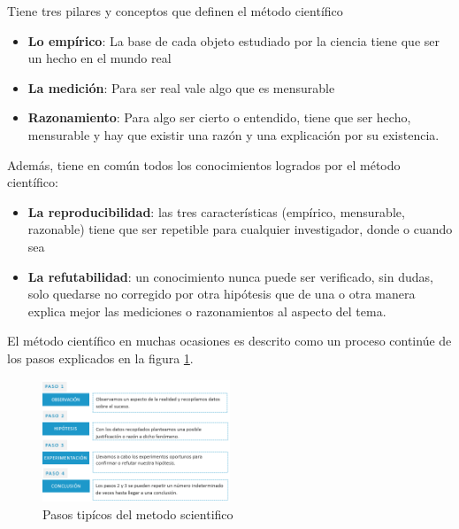 \documentclass[article]{elsarticle}
\begin{document}
\vspace{1.5\baselineskip}

Tiene tres pilares y conceptos que definen el método científico

\begin{itemize}
\item \textbf{Lo empírico}: La base de cada objeto estudiado por la ciencia
    tiene que ser un hecho en el mundo real
\item \textbf{La medición}: Para ser real vale algo que es mensurable
\item \textbf{Razonamiento}: Para algo ser cierto o entendido, tiene que ser
    hecho, mensurable y hay que existir una razón y una explicación por su existencia.
\end{itemize}

\vspace{1.5\baselineskip}

Además, tiene en común todos los conocimientos logrados por el método científico:
\begin{itemize}
\item \textbf{La reproducibilidad}: las tres características (empírico,
    mensurable, razonable) tiene que ser repetible para cualquier investigador,
    donde o cuando sea
\item \textbf{La refutabilidad}: un conocimiento nunca puede ser verificado,
    sin dudas, solo quedarse no corregido por otra hipótesis que de una o otra
    manera explica mejor las mediciones o razonamientos al aspecto del tema.
\end{itemize}

\vspace{1.5\baselineskip}

El método científico en muchas ocasiones es descrito como un proceso continúe de los pasos
explicados en la figura \ref{fig1}.

\begin{figure}[h]
\centering
\includegraphics[width=0.5\textwidth]{img1}
\caption{Pasos tipícos del metodo scientifico}
\label{fig1}
\end{figure}
\end{document}
